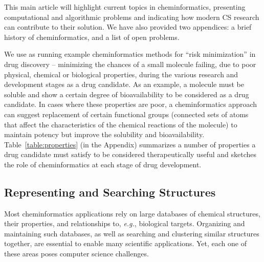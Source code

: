 \documentclass{sig-alternate}
\begin{document}
This main article will highlight current topics in
cheminformatics, presenting computational and algorithmic problems
and indicating how modern CS research can contribute to their
solution.  We have also provided two appendices: a brief history of
cheminformatics, and a list of open problems.

We use as running example cheminformatics methods for
``risk minimization'' in drug
discovery -- minimizing the chances
of a small molecule failing, due to poor physical, chemical or
biological properties, during the various research
and development stages
as a drug candidate. As an example, a molecule must be soluble
and show a certain degree of bioavailability to be considered as a
drug candidate. In cases where these properties are poor, a
cheminformatics approach can suggest replacement of certain functional
groups (connected
sets of atoms that affect the characteristics of the chemical
reactions of the molecule)
to maintain potency but improve the solubility and
bioavailability.  Table~\ref{table:properties} (in the Appendix)
summarizes a number of properties a drug candidate must satisfy to be
considered therapeutically useful
and sketches the role of cheminformatics at each
stage of drug development.
%
\subsection{Representing and Searching Structures}
\label{sec:databases}
%
Most cheminformatics applications rely on large databases of chemical
structures, their properties, and relationships to, \textit{e.g.},
biological targets.  Organizing and maintaining such databases, as
well as searching and clustering similar structures together, are
essential to enable many scientific applications. Yet, each one of
these areas poses computer science challenges.
\end{document}
